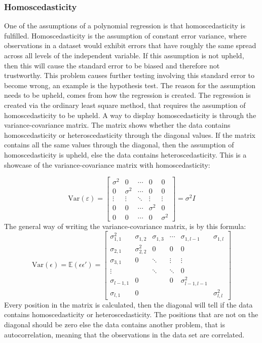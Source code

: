 \subsubsection{Homoscedasticity}
One of the assumptions of a polynomial regression is that homoscedasticity is fulfilled. Homoscedasticity is the assumption of constant error variance, where observations in a dataset would exhibit errors that have roughly the same spread across all levels of the independent variable.
\newline
If this assumption is not upheld, then this will cause the standard error to be biased and therefore not trustworthy. This problem causes further testing involving this standard error to become wrong, an example is the hypothesis test.
\newline
The reason for the assumption needs to be upheld, comes from how the regression is created. The regression is created via the ordinary least square method, that requires the assumption of homoscedasticity to be upheld.
\newline
A way to display homoscedasticity is through the variance-covariance matrix. The matrix shows whether the data contains homoscedasticity or heteroscedasticity through the diagonal values. If the matrix contains all the same values through the diagonal, then the assumption of homoscedasticity is upheld, else the data contains heteroscedasticity. This is a showcase of the variance-covariance matrix with homoscedasticity:


	
	\[
	\text{Var}(\varepsilon) = \begin{bmatrix}
		\sigma^2 & 0 & \cdots & 0 & 0 \\
		0 & \sigma^2 & \cdots & 0 & 0 \\
		\vdots & \vdots & \ddots & \vdots & \vdots \\
		0 & 0 & \cdots & \sigma^2 & 0 \\
		0 & 0 & \cdots & 0 & \sigma^2
	\end{bmatrix} = \sigma^2 I
	\]
\newline
The general way of writing the variance-covariance matrix, is by this formula:
\[
\text{Var}(\epsilon) = \mathbb{E}(\epsilon \epsilon') = \begin{bmatrix}
	\sigma_{1,1}^2 & \sigma_{1,2} & \sigma_{1,3} & \cdots & \sigma_{1,l-1} & \sigma_{1,l} \\
	\sigma_{2,1} & \sigma_{2,2}^2 & 0 & 0 & 0 \\
	\sigma_{3,1} & 0 & \ddots & \vdots & \vdots \\
	\vdots & & \ddots & \ddots & 0 \\
	\sigma_{l-1,1} & 0 & & 0 & \sigma_{l-1,l-1}^2 \\
	\sigma_{l,1} & 0 & & & & \sigma_{l,l}^2 
\end{bmatrix}
\]
\newline
Every position in the matrix is calculated, then the diagonal will tell if the data contains homoscedasticity or heteroscedasticity. The positions that are not on the diagonal should be zero else the data contains another problem, that is autocorrelation, meaning that the observations in the data set are correlated.

